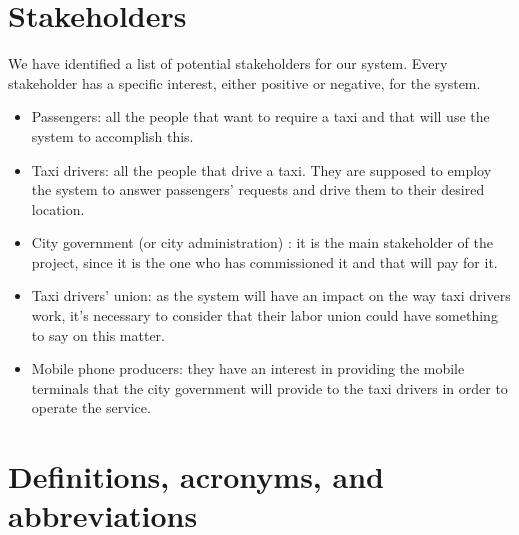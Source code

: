 \section{Stakeholders}
We have identified a list of potential stakeholders for our system. Every stakeholder has a specific interest, either positive or negative, for the system.
\begin{itemize}
\item Passengers: all the people that want to require a taxi and that will use the system to accomplish this.
\item Taxi drivers: all the people that drive a taxi. They are supposed to employ the system to answer passengers’ requests and drive them to their desired location.
\item City government (or city administration) : it is the main stakeholder of the project, since it is the one who has commissioned it and that will pay for it.
\item Taxi drivers’ union: as the system will have an impact on the way taxi drivers work, it's necessary to consider that their labor union could have something to say on this matter. 
\item Mobile phone producers: they have an interest in providing the mobile terminals that the city government will provide to the taxi drivers in order to operate the service. 
\end{itemize}


\section{Definitions, acronyms, and abbreviations}
